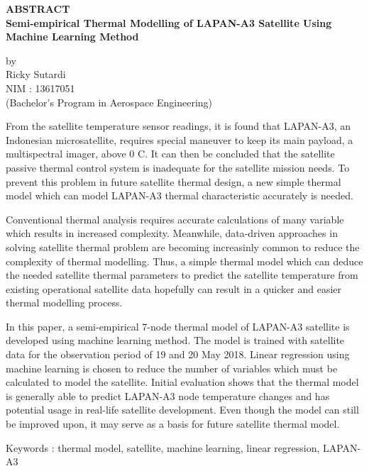 \begin{center}
       \Large
       \textbf{ABSTRACT} \\
        \vspace{1.5cm}
        \large
        \textbf{Semi-empirical Thermal Modelling of LAPAN-A3 Satellite Using Machine Learning Method}\\
        
        \vspace{1.5cm}
        
        by\\
        Ricky Sutardi\\
        NIM : 13617051\\
        (Bachelor's Program in Aerospace Engineering)\\
        \vspace{1.5cm}
\end{center}

From the satellite temperature sensor readings, it is found that LAPAN-A3, an
Indonesian microsatellite, requires special maneuver to keep its main payload,
a multispectral imager, above 0 \degree C. It can then be concluded that the
satellite passive thermal control system is inadequate for the satellite
mission needs. To prevent this problem in future satellite thermal design, a
new simple thermal model which can model LAPAN-A3 thermal characteristic
accurately is needed.

Conventional thermal analysis requires accurate calculations of many variable
which results in increased complexity. Meanwhile, data-driven approaches in
solving satellite thermal problem are becoming increasinly common to reduce
the complexity of thermal modelling. Thus, a simple thermal model which can
deduce the needed satellite thermal parameters to predict the satellite
temperature from existing operational satellite data hopefully can result in a
quicker and easier thermal modelling process.

In this paper, a semi-empirical 7-node thermal model of LAPAN-A3 satellite is
developed using machine learning method. The model is trained with satellite
data for the observation period of 19 and 20 May 2018. Linear regression using
machine learning is chosen to reduce the number of variables which must be
calculated to model the satellite. Initial evaluation shows that the thermal
model is generally able to predict LAPAN-A3 node temperature changes and has
potential usage in real-life satellite development. Even though the model can
still be improved upon, it may serve as a basis for future satellite thermal
model.

\vspace{1.0cm}
\noindent 
Keywords : thermal model, satellite, machine learning, linear regression, LAPAN-A3 
